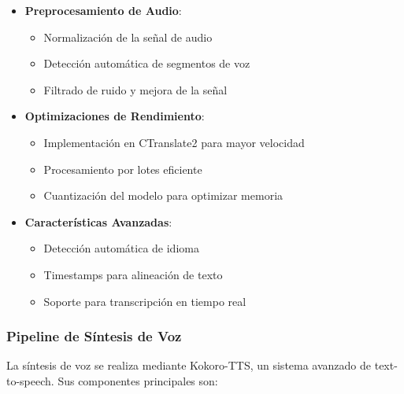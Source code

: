 \begin{itemize}
    \item \textbf{Preprocesamiento de Audio}:
    \begin{itemize}
        \item Normalización de la señal de audio
        \item Detección automática de segmentos de voz
        \item Filtrado de ruido y mejora de la señal
    \end{itemize}

    \item \textbf{Optimizaciones de Rendimiento}:
    \begin{itemize}
        \item Implementación en CTranslate2 para mayor velocidad
        \item Procesamiento por lotes eficiente
        \item Cuantización del modelo para optimizar memoria
    \end{itemize}

    \item \textbf{Características Avanzadas}:
    \begin{itemize}
        \item Detección automática de idioma
        \item Timestamps para alineación de texto
        \item Soporte para transcripción en tiempo real
    \end{itemize}
\end{itemize}

\subsubsection{Pipeline de Síntesis de Voz}

La síntesis de voz se realiza mediante Kokoro-TTS, un sistema avanzado de text-to-speech. Sus componentes principales son:

